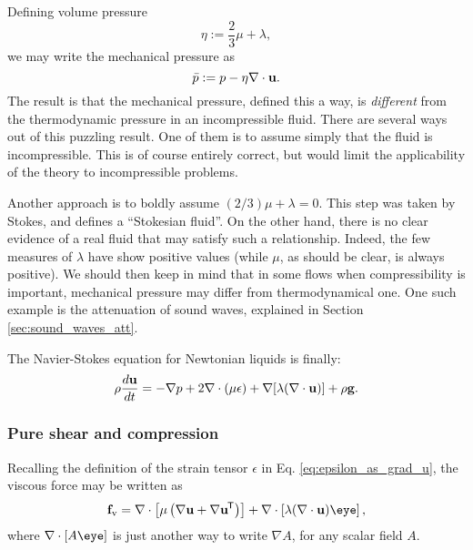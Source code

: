 Defining volume pressure
\begin{equation}
  \label{eq:vol_visc_definition}
  \eta:=\frac23 \mu  + \lambda,
\end{equation}
we may write the mechanical pressure as
\begin{equation}
  \label{eq:mech_p_definition}
  \bar{p} :=
  p - \eta \nabla\cdot \mathbf{u} .
\end{equation}
%
The result is that the mechanical pressure, defined this a way, is
\emph{different} from the thermodynamic pressure in an incompressible
fluid.  There are several ways out of this puzzling result. One of
them is to assume simply that the fluid is incompressible. This is of
course entirely correct, but would limit the applicability of the
theory to incompressible problems.

Another approach is to boldly assume $( 2/3 ) \mu+\lambda=0$. This
step was taken by Stokes, and defines a ``Stokesian fluid''. On the
other hand, there is no clear evidence of a real fluid that may
satisfy such a relationship. Indeed, the few measures of $\lambda$
have show positive values (while $\mu$, as should be clear, is always
positive). We should then keep in mind that in some flows when
compressibility is important, mechanical pressure may differ from
thermodynamical one. One such example is the attenuation of sound
waves, explained in Section \ref{sec:sound_waves_att}.

The Navier-Stokes equation for Newtonian liquids is finally:
\begin{equation}
  \label{eq:NS_Newtonian}
  \rho \frac{d\mathbf{u} }{dt} =
  - \nabla p +
  2 \nabla \cdot ( \mu \epsilon)
  + \nabla [ \lambda ( \nabla\cdot\mathbf{u} ) ]
  + \rho \mathbf{g} .
\end{equation}



\subsubsection{Pure shear and compression}

Recalling the definition of the strain tensor $\epsilon$
in Eq. \ref{eq:epsilon_as_grad_u}, the viscous force may be written as
\begin{equation*}
  \bff_\mathrm{v}=
  \nabla \cdot \left[ \mu  \left( \nabla\bfu + \nabla\bfu\tran \right) \right] +
  \nabla \cdot \left[ \lambda (\divu) \eye \right] ,
\end{equation*}
where $\nabla \cdot \left[ A \eye \right] $ is just another way to
write $\nabla A$, for any scalar field $A$.


